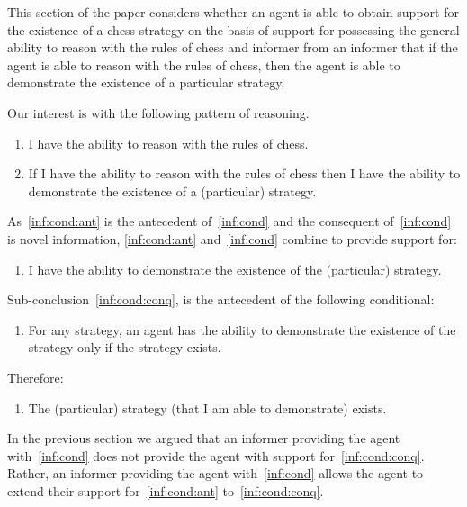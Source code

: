 \documentclass[10pt]{article}
\begin{document}
\begin{note}
  This section of the paper considers whether an agent is able to obtain support for the existence of a chess strategy on the basis of support for possessing the general ability to reason with the rules of chess and informer from an informer that if the agent is able to reason with the rules of chess, then the agent is able to demonstrate the existence of a particular strategy.

  Our interest is with the following pattern of reasoning.
  \begin{enumerate}[label=(S\arabic*), ref=(S\arabic*)]
  \item\label{inf:cond:ant} I have the ability to reason with the rules of chess.
  \item\label{inf:cond}\label{inf:cond} If I have the ability to reason with the rules of chess then I have the ability to demonstrate the existence of a (particular) strategy.
  \end{enumerate}
  As~\ref{inf:cond:ant} is the antecedent of~\ref{inf:cond} and the consequent of~\ref{inf:cond} is novel information, \ref{inf:cond:ant} and~\ref{inf:cond} combine to provide support for:
  \begin{enumerate}[resume, label=(S\arabic*), ref=(S\arabic*)]
  \item\label{inf:cond:conq} I have the ability to demonstrate the existence of the (particular) strategy.
  \end{enumerate}
  Sub-conclusion~\ref{inf:cond:conq}, is the antecedent of the following conditional:
  \begin{enumerate}[resume, label=(S\arabic*), ref=(S\arabic*)]
  \item\label{inf:gae} For any strategy, an agent has the ability to demonstrate the existence of the strategy only if the strategy exists.
  \end{enumerate}
  Therefore:
  \begin{enumerate}[resume, label=(S\arabic*), ref=(S\arabic*)]
  \item\label{inf:sse} The (particular) strategy (that I am able to demonstrate) exists.
  \end{enumerate}

  In the previous section we argued that an informer providing the agent with~\ref{inf:cond} does not provide the agent with support for~\ref{inf:cond:conq}.
  Rather, an informer providing the agent with~\ref{inf:cond} allows the agent to extend their support for~\ref{inf:cond:ant} to~\ref{inf:cond:conq}.


\end{note}
\end{document}
